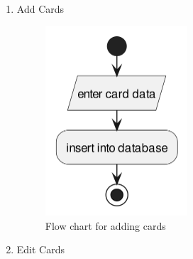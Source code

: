 \documentclass[a4paper]{article}
\begin{document}
\begin{enumerate}
\item Add Cards
\label{sec:org2861c17}
\begin{figure}[htbp]
\centering
\includegraphics[width=200px]{diagrams/add-cards-flow-chart.png}
\caption{Flow chart for adding cards}
\end{figure}
\FloatBarrier

\item Edit Cards
\label{sec:org82284b9}


\end{enumerate}
\end{document}
